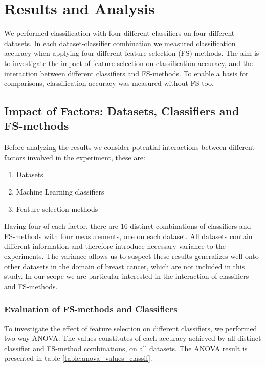\chapter{Results and Analysis}

We performed classification with four different classifiers on four different datasets. In each dataset-classifier combination we measured classification accuracy when applying four different feature selection (FS) methods. The aim is to investigate the impact of feature selection on classification accuracy, and the interaction between different classifiers and FS-methods. To enable a basis for comparisons, classification accuracy was measured without FS too.

\section{Impact of Factors: Datasets, Classifiers and FS-methods}
\label{Variation_among_factors}

Before analyzing the results we consider potential interactions between different factors involved in the experiment, these are:

\begin{enumerate}
  \item Datasets
  \item Machine Learning classifiers
  \item Feature selection methods
\end{enumerate}

Having four of each factor, there are 16 distinct combinations of classifiers and FS-methods with four measurements, one on each dataset. All datasets contain different information and therefore introduce necessary variance to the experiments. The variance allows us to suspect these results generalizes well onto other datasets in the domain of breast cancer, which are not included in this study. In our scope we are particular interested in the interaction of classifiers and FS-methods.

% 

\subsection{Evaluation of FS-methods and Classifiers}
\label{sec:fs_methods_classifiers}

To investigate the effect of feature selection on different classifiers, we performed two-way ANOVA. The values constitutes of each accuracy achieved by all distinct classifier and FS-method combinations, on all datasets. The ANOVA result is presented in table \ref{table:anova_values_classif}.

